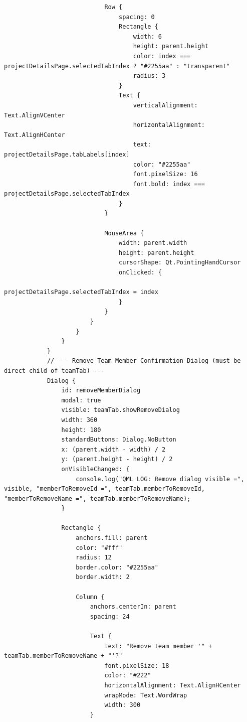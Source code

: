 \documentclass{report}
\begin{document}
\begin{lstlisting}
                            Row {
                                spacing: 0
                                Rectangle {
                                    width: 6
                                    height: parent.height
                                    color: index === projectDetailsPage.selectedTabIndex ? "#2255aa" : "transparent"
                                    radius: 3
                                }
                                Text {
                                    verticalAlignment: Text.AlignVCenter
                                    horizontalAlignment: Text.AlignHCenter
                                    text: projectDetailsPage.tabLabels[index]
                                    color: "#2255aa"
                                    font.pixelSize: 16
                                    font.bold: index === projectDetailsPage.selectedTabIndex
                                }
                            }

                            MouseArea {
                                width: parent.width
                                height: parent.height
                                cursorShape: Qt.PointingHandCursor
                                onClicked: {
                                    projectDetailsPage.selectedTabIndex = index
                                }
                            }
                        }
                    }
                }
            }
            // --- Remove Team Member Confirmation Dialog (must be direct child of teamTab) ---
            Dialog {
                id: removeMemberDialog
                modal: true
                visible: teamTab.showRemoveDialog
                width: 360
                height: 180
                standardButtons: Dialog.NoButton
                x: (parent.width - width) / 2
                y: (parent.height - height) / 2
                onVisibleChanged: {
                    console.log("QML LOG: Remove dialog visible =", visible, "memberToRemoveId =", teamTab.memberToRemoveId, "memberToRemoveName =", teamTab.memberToRemoveName);
                }

                Rectangle {
                    anchors.fill: parent
                    color: "#fff"
                    radius: 12
                    border.color: "#2255aa"
                    border.width: 2

                    Column {
                        anchors.centerIn: parent
                        spacing: 24

                        Text {
                            text: "Remove team member '" + teamTab.memberToRemoveName + "'?"
                            font.pixelSize: 18
                            color: "#222"
                            horizontalAlignment: Text.AlignHCenter
                            wrapMode: Text.WordWrap
                            width: 300
                        }


\end{lstlisting}
\end{document}
